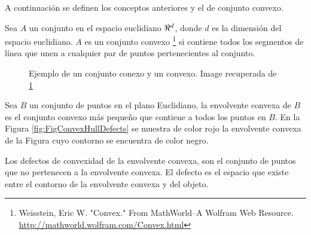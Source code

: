 A continuación se definen los conceptos anteriores y el de conjunto convexo.

Sea $A$ un conjunto en el espacio euclidiano $\bold{\Re}^d$, donde $d$ es la dimensión del espacio euclidiano. $A$ es un conjunto convexo \footnote{\label{ConvexFN} Weisstein, Eric W. "Convex." From MathWorld--A Wolfram Web Resource. \url{http://mathworld.wolfram.com/Convex.html}} si contiene todos los segmentos de línea que unen a cualquier par de puntos pertenecientes al conjunto.  
\begin{figure}[h!]
\centering
{} \hspace{10mm}
 \hspace{10mm}
\caption{Ejemplo de un conjunto conexo y un convexo. Image recuperada de \ref{ConvexFN} }\label{fig:Sets}
\end{figure} 

Sea $B$ un conjunto de puntos en el plano Euclidiano, la envolvente convexa de $B$ es el conjunto convexo más pequeño que contiene a todos los puntos en $B$. En la Figura \ref{fig:FigConvexHullDefects} se muestra de color rojo la envolvente convexa de la Figura cuyo contorno se encuentra de color negro. 

Los defectos de convexidad de la envolvente convexa, son el conjunto de puntos que no pertenecen a la envolvente convexa. El defecto es el espacio que existe entre el contorno de la envolvente convexa y del objeto.


